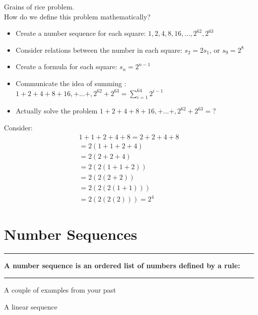 \documentclass[12pt]{article}
\begin{document}
\begin{center}
\end{center}
\newpage
Grains of rice problem.\\
How do we define this problem mathematically?
\begin{itemize}
	\item Create a number sequence for each square: $1,2,4,8,16,..., 2^{62},  2^{63}$
	\item Consider relations between the number in each square: $s_2 = 2s_1$, or $s_9= 2^8$
	\item Create a formula for each square: $s_n = 2^{n-1}$
	\item Communicate the idea of summing : $\displaystyle 1+2+4+8+16,+...+, 2^{62}+2^{63} = \sum_{i=1}^{64} 2^{i-1}$
	\item Actually solve the problem  $1+2+4+8+16,+...+, 2^{62}+2^{63} = ?$
\end{itemize}
Consider:
\begin{align*}
	1+1+2+4+8 = 2+2+4+8\\
	=2(1+1+2+4)\\
		=2(2+2+4)\\
		=2(2(1+1+2))\\
		=2(2(2+2))\\
		=2(2(2(1+1)))\\
		=2(2(2(2)))
		=2^4
\end{align*}
\newpage
\section*{Number Sequences}
\Large
\hrule\vspace{1cm}

\textbf{A number sequence is an ordered list of numbers defined by a rule:}
\vspace{1cm}\hrule\vspace{1cm}

A couple of examples from your past

A linear sequence
\end{document}
